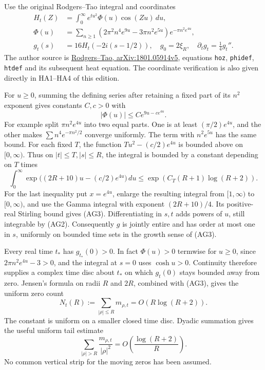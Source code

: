 \documentclass[
  10pt,
  a4paper,
]{article}
\begin{document}
Use the original Rodgers--Tao integral and coordinates \[
\begin{aligned}
H_t(Z)&=\int_0^\infty e^{tu^2}\Phi(u)\cos(Zu)\,du,\\
\Phi(u)&=\sum_{n\ge1}(2\pi^2n^4e^{9u}-3\pi n^2e^{5u})e^{-\pi n^2e^{4u}},\\
g_t(s)&=16H_t(-2i(s-1/2)),\quad g_0=2\xi_R,\quad
\partial_tg_t=\tfrac14g_t''.
\end{aligned}\tag{AG1}
\] The author source is
\href{https://arxiv.org/src/1801.05914v5}{Rodgers--Tao,
arXiv:1801.05914v5}, equations \texttt{hoz}, \texttt{phidef},
\texttt{htdef} and its subsequent heat equation. The coordinate
verification is also given directly in HA1--HA4 of this edition.

For \(u\ge0\), summing the defining series after retaining a fixed part
of its \(n^2\) exponent gives constants \(C,c>0\) with \[
|\Phi(u)|\le C e^{9u-ce^{4u}}.
\tag{AG2}
\] For example split \(\pi n^2e^{4u}\) into two equal parts. One is at
least \((\pi/2)e^{4u}\), and the other makes \(\sum n^4e^{-\pi n^2/2}\)
converge uniformly. The term with \(n^2e^{5u}\) has the same bound. For
each fixed \(T\), the function \(Tu^2-(c/2)e^{4u}\) is bounded above on
\([0,\infty)\). Thus on \(|t|\le T, |s|\le R\), the integral is bounded
by a constant depending on \(T\) times \[
\int_0^\infty \exp\bigl((2R+10)u-(c/2)e^{4u}\bigr)\,du
\le \exp(C_T(R+1)\log(R+2)).
\tag{AG3}
\] For the last inequality put \(x=e^{4u}\), enlarge the resulting
integral from \([1,\infty)\) to \([0,\infty)\), and use the Gamma
integral with exponent \((2R+10)/4\). Its positive-real Stirling bound
gives (AG3). Differentiating in \(s,t\) adds powers of \(u\), still
integrable by (AG2). Consequently \(g\) is jointly entire and has order
at most one in \(s\), uniformly on bounded time sets in the growth sense
of (AG3).

Every real time \(t_*\) has \(g_{t_*}(0)>0\). In fact \(\Phi(u)>0\)
termwise for \(u\ge0\), since \(2\pi n^2e^{4u}-3>0\), and the integral
at \(s=0\) uses \(\cosh u>0\). Continuity therefore supplies a complex
time disc about \(t_*\) on which \(g_t(0)\) stays bounded away from
zero. Jensen's formula on radii \(R\) and \(2R\), combined with (AG3),
gives the uniform zero count \[
N_t(R):=\sum_{|\rho|\le R}m_{\rho,t}=O(R\log(R+2)).
\tag{AG4}
\] The constant is uniform on a smaller closed time disc. Dyadic
summation gives the useful uniform tail estimate \[
\sum_{|\rho|>R}\frac{m_{\rho,t}}{|\rho|^2}
=O\left(\frac{\log(R+2)}R\right).
\tag{AG5}
\] No common vertical strip for the moving zeros has been assumed.
\end{document}
